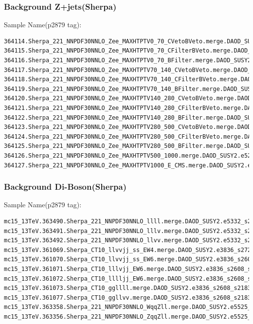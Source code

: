 \documentclass[mathserif,serif]{beamer}
\begin{document}
\begin{frame}[fragile]
\frametitle{Background Z+jets(Sherpa)}
\small
Sample Name(p2879 tag):
\tiny
\begin{verbatim}
364114.Sherpa_221_NNPDF30NNLO_Zee_MAXHTPTV0_70_CVetoBVeto.merge.DAOD_SUSY2.e5299_s2726_r7772_r7676_p2879
364115.Sherpa_221_NNPDF30NNLO_Zee_MAXHTPTV0_70_CFilterBVeto.merge.DAOD_SUSY2.e5299_s2726_r7772_r7676_p2879
364116.Sherpa_221_NNPDF30NNLO_Zee_MAXHTPTV0_70_BFilter.merge.DAOD_SUSY2.e5299_s2726_r7772_r7676_p2879
364117.Sherpa_221_NNPDF30NNLO_Zee_MAXHTPTV70_140_CVetoBVeto.merge.DAOD_SUSY2.e5299_s2726_r7772_r7676_p2879
364118.Sherpa_221_NNPDF30NNLO_Zee_MAXHTPTV70_140_CFilterBVeto.merge.DAOD_SUSY2.e5299_s2726_r7772_r7676_p2879
364119.Sherpa_221_NNPDF30NNLO_Zee_MAXHTPTV70_140_BFilter.merge.DAOD_SUSY2.e5299_s2726_r7772_r7676_p2879
364120.Sherpa_221_NNPDF30NNLO_Zee_MAXHTPTV140_280_CVetoBVeto.merge.DAOD_SUSY2.e5299_s2726_r7772_r7676_p2879
364121.Sherpa_221_NNPDF30NNLO_Zee_MAXHTPTV140_280_CFilterBVeto.merge.DAOD_SUSY2.e5299_s2726_r7772_r7676_p2879
364122.Sherpa_221_NNPDF30NNLO_Zee_MAXHTPTV140_280_BFilter.merge.DAOD_SUSY2.e5299_s2726_r7772_r7676_p2879
364123.Sherpa_221_NNPDF30NNLO_Zee_MAXHTPTV280_500_CVetoBVeto.merge.DAOD_SUSY2.e5299_s2726_r7772_r7676_p2879
364124.Sherpa_221_NNPDF30NNLO_Zee_MAXHTPTV280_500_CFilterBVeto.merge.DAOD_SUSY2.e5299_s2726_r7772_r7676_p2879
364125.Sherpa_221_NNPDF30NNLO_Zee_MAXHTPTV280_500_BFilter.merge.DAOD_SUSY2.e5299_s2726_r7772_r7676_p2879
364126.Sherpa_221_NNPDF30NNLO_Zee_MAXHTPTV500_1000.merge.DAOD_SUSY2.e5299_s2726_r7772_r7676_p2879
364127.Sherpa_221_NNPDF30NNLO_Zee_MAXHTPTV1000_E_CMS.merge.DAOD_SUSY2.e5299_s2726_r7772_r7676_p2879
\end{verbatim}
\end{frame}

\begin{frame}[fragile]
\frametitle{Background Di-Boson(Sherpa)}
\small
Sample Name(p2879 tag):
\tiny
\begin{verbatim}
mc15_13TeV.363490.Sherpa_221_NNPDF30NNLO_llll.merge.DAOD_SUSY2.e5332_s2726_r7772_r7676_p2879
mc15_13TeV.363491.Sherpa_221_NNPDF30NNLO_lllv.merge.DAOD_SUSY2.e5332_s2726_r7772_r7676_p2879
mc15_13TeV.363492.Sherpa_221_NNPDF30NNLO_llvv.merge.DAOD_SUSY2.e5332_s2726_r7772_r7676_p2879
mc15_13TeV.361069.Sherpa_CT10_llvvjj_ss_EW4.merge.DAOD_SUSY2.e3836_s2726_r7772_r7676_p2879
mc15_13TeV.361070.Sherpa_CT10_llvvjj_ss_EW6.merge.DAOD_SUSY2.e3836_s2608_r7772_r7676_p2879
mc15_13TeV.361071.Sherpa_CT10_lllvjj_EW6.merge.DAOD_SUSY2.e3836_s2608_s2183_r7772_r7676_p2879
mc15_13TeV.361072.Sherpa_CT10_lllljj_EW6.merge.DAOD_SUSY2.e3836_s2608_s2183_r7772_r7676_p2879
mc15_13TeV.361073.Sherpa_CT10_ggllll.merge.DAOD_SUSY2.e3836_s2608_s2183_r7772_r7676_p2879
mc15_13TeV.361077.Sherpa_CT10_ggllvv.merge.DAOD_SUSY2.e3836_s2608_s2183_r7772_r7676_p2879
mc15_13TeV.363358.Sherpa_221_NNPDF30NNLO_WqqZll.merge.DAOD_SUSY2.e5525_s2726_r7772_r7676_p2879
mc15_13TeV.363356.Sherpa_221_NNPDF30NNLO_ZqqZll.merge.DAOD_SUSY2.e5525_s2726_r7772_r7676_p2879
\end{verbatim}
\end{frame}
\end{document}
